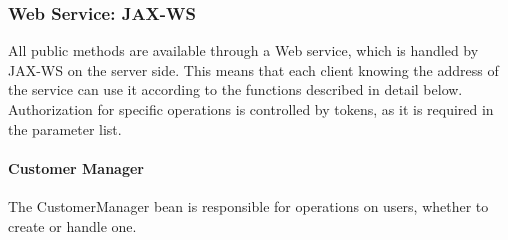\subsubsection{Web Service: JAX-WS} %
\label{ssub:web_service_jax_ws}
All public methods are available through a Web service, which is handled by JAX-WS on the server side. This means that each client knowing the address of the service can use it according to the functions described in detail below. Authorization for specific operations is controlled by tokens, as it is required in the parameter list.

\newpage
\paragraph{Customer Manager} %
\label{par:customer_manager}
The CustomerManager bean is responsible for operations on users, whether to create or handle one.

